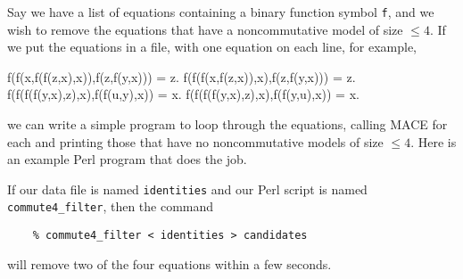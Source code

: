 \documentclass[11pt]{article}
\begin{document}
Say we have a list of equations containing a binary function
symbol \texttt{f}, and we wish to remove the equations
that have a noncommutative model of size $\leq 4$.
If we put the equations in a file, with one equation on
each line, for example,
\begin{center}
\begin{small}
\begin{boxedverbatim}
f(f(x,f(f(z,x),x)),f(z,f(y,x))) = z.
f(f(f(x,f(z,x)),x),f(z,f(y,x))) = z.
f(f(f(f(y,x),z),x),f(f(u,y),x)) = x.
f(f(f(f(y,x),z),x),f(f(y,u),x)) = x.
\end{boxedverbatim}
\end{small}
\end{center}
we can write a simple program to loop through the
equations, calling MACE for each and printing those
that have no noncommutative models of size $\leq 4$.
Here is an example Perl program that does the job.
\begin{center}
\begin{footnotesize}
\end{footnotesize}
\end{center}
If our data file is named \texttt{identities} and our Perl script
is named \texttt{commute4\_filter}, then the command

\begin{small}
\begin{verbatim}
    % commute4_filter < identities > candidates
\end{verbatim}
\end{small}
\noindent will remove two of the four equations within a few seconds.
\end{document}
